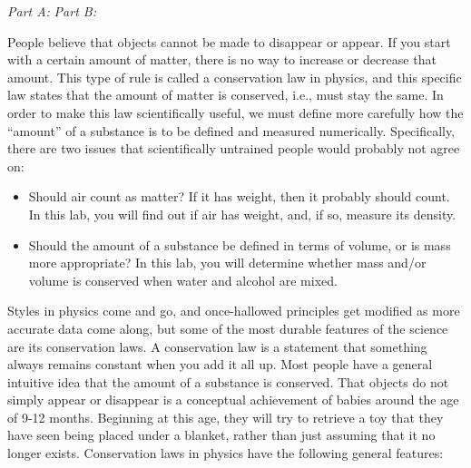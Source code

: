 \label{lab:conservation-laws}

\apparatus
\emph{Part A:}
\emph{Part B: }

\longgoal

People believe that objects cannot be made to disappear or
appear.  If you start with a certain amount of matter, there
is no way to increase or decrease that amount.  This type of
rule is called a conservation law in physics, and this
specific law states that the amount of matter is conserved,
i.e., must stay the same.  In order to make this law
scientifically useful, we must define more carefully how the
``amount'' of a substance is to be defined and measured
numerically.  Specifically, there are two issues that
scientifically untrained people would probably not agree on:

\begin{itemize}
\item[] Should air count as matter?  If it has weight, then it
probably should count.  In this lab, you will find out if
air has weight, and, if so, measure its density.

\item[] Should the amount of a substance be defined in terms of
volume, or is mass more appropriate?  In this lab, you will
determine whether mass and/or volume is conserved when water
and alcohol are mixed.
\end{itemize}

\introduction

Styles in physics come and go, and once-hallowed principles
get modified as more accurate data come along, but some of
the most durable features of the science are its conservation
laws.  A conservation law is a statement that something
always remains constant when you add it all up.  Most people
have a general intuitive idea that the amount of a substance
is conserved.  That objects do not simply appear or
disappear is a conceptual achievement of babies around the
age of 9-12 months.  Beginning at this age, they will try
to retrieve a toy that they have seen being
placed under a blanket, rather than just assuming that it no
longer exists. Conservation laws in physics have the
following general features:


